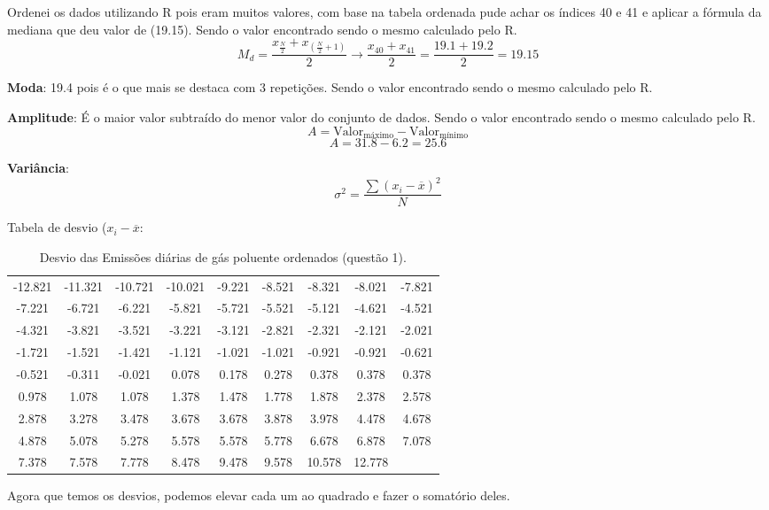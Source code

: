 \documentclass[a4paper,11pt]{article}
\begin{document}
\begin{description}
Ordenei os dados utilizando R pois eram muitos valores, com base na tabela ordenada pude achar os índices 40 e 41 e aplicar a fórmula da mediana que deu valor de (19.15). Sendo o valor encontrado sendo o mesmo calculado pelo R. 
\[M_d = \frac{x_{\frac{N}{2}} + x_{(\frac{N}{2} + 1)}}{2} \xrightarrow{} \frac{x_{40} + x_{41}}{2}  = \frac{19.1 + 19.2}{2} = 19.15\]
 
\textbf{Moda}: 19.4 pois é o que mais se destaca com 3 repetições. Sendo o valor encontrado sendo o mesmo calculado pelo R.


\textbf{Amplitude}: É o maior valor subtraído do menor valor do conjunto de dados. Sendo o valor encontrado sendo o mesmo calculado pelo R.
\[ A = \text{Valor}_{\text{máximo}} -\text{Valor}_{\text{mínimo}} \]
\[A = 31.8 - 6.2 = 25.6\]

\textbf{Variância}: \[\sigma^2 = \frac{\sum (x_i - \overline{x})^2}{N}\]

Tabela de desvio ($x_i - \overline{x}$:
\begin{table}[H]
    \centering
    \begin{tabular}{ccccccccc}
        \hline
        -12.821 & -11.321 & -10.721 & -10.021 & -9.221 & -8.521 & -8.321 & -8.021 & -7.821 \\ 
        -7.221 & -6.721 & -6.221 & -5.821 & -5.721 & -5.521 & -5.121 & -4.621 & -4.521 \\ 
        -4.321 & -3.821 & -3.521 & -3.221 & -3.121 & -2.821 & -2.321 & -2.121 & -2.021 \\ 
        -1.721 & -1.521 & -1.421 & -1.121 & -1.021 & -1.021 & -0.921 & -0.921 & -0.621 \\ 
        -0.521 & -0.311 & -0.021 & 0.078 & 0.178 & 0.278 & 0.378 & 0.378 & 0.378 \\ 
        0.978 & 1.078 & 1.078 & 1.378 & 1.478 & 1.778 & 1.878 & 2.378 & 2.578 \\ 
        2.878 & 3.278 & 3.478 & 3.678 & 3.678 & 3.878 & 3.978 & 4.478 & 4.678 \\ 
        4.878 & 5.078 & 5.278 & 5.578 & 5.578 & 5.778 & 6.678 & 6.878 & 7.078 \\ 
        7.378 & 7.578 & 7.778 & 8.478 & 9.478 & 9.578 & 10.578 & 12.778 \\ 
        \hline
    \end{tabular}
    \caption{Desvio das Emissões diárias de gás poluente ordenados (questão 1).}
    \label{tab:q1}
\end{table}

Agora que temos os desvios, podemos elevar cada um ao quadrado e fazer o somatório deles.


\end{description}
\end{document}
